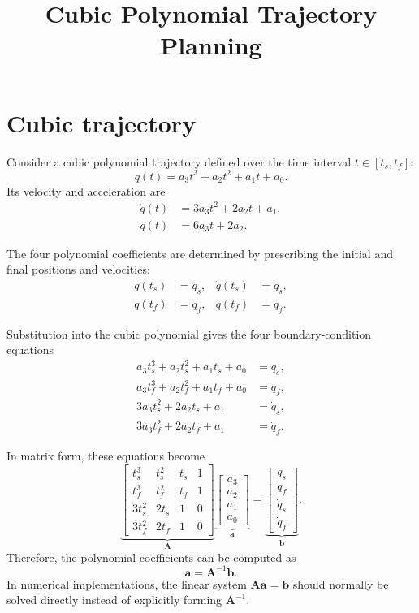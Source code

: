 \documentclass[11pt,a4paper]{article}
\title{Cubic Polynomial Trajectory Planning}
\author{}
\date{}
\begin{document}
\maketitle

\section{Cubic trajectory}

Consider a cubic polynomial trajectory defined over the time interval
$t\in[t_s,t_f]$:
\begin{equation}
    q(t)=a_3t^3+a_2t^2+a_1t+a_0.
\end{equation}
Its velocity and acceleration are
\begin{align}
    \dot q(t) &= 3a_3t^2+2a_2t+a_1,\\
    \ddot q(t) &= 6a_3t+2a_2.
\end{align}

The four polynomial coefficients are determined by prescribing the initial
and final positions and velocities:
\begin{align}
    q(t_s) &= q_s, & \dot q(t_s) &= \dot q_s,\\
    q(t_f) &= q_f, & \dot q(t_f) &= \dot q_f.
\end{align}

Substitution into the cubic polynomial gives the four boundary-condition
equations
\begin{align}
    a_3t_s^3+a_2t_s^2+a_1t_s+a_0 &= q_s,\\
    a_3t_f^3+a_2t_f^2+a_1t_f+a_0 &= q_f,\\
    3a_3t_s^2+2a_2t_s+a_1 &= \dot q_s,\\
    3a_3t_f^2+2a_2t_f+a_1 &= \dot q_f.
\end{align}

In matrix form, these equations become
\begin{equation}
\underbrace{\begin{bmatrix}
    t_s^3  & t_s^2 & t_s & 1\\
    t_f^3  & t_f^2 & t_f & 1\\
    3t_s^2 & 2t_s  & 1   & 0\\
    3t_f^2 & 2t_f  & 1   & 0
\end{bmatrix}}_{\bm{A}}
\underbrace{\begin{bmatrix}
    a_3\\a_2\\a_1\\a_0
\end{bmatrix}}_{\bm{a}}
=
\underbrace{\begin{bmatrix}
    q_s\\q_f\\\dot q_s\\\dot q_f
\end{bmatrix}}_{\bm{b}}.
\end{equation}
Therefore, the polynomial coefficients can be computed as
\begin{equation}
    \boxed{\bm{a}=\bm{A}^{-1}\bm{b}}.
\end{equation}
In numerical implementations, the linear system $\bm{A}\bm{a}=\bm{b}$
should normally be solved directly instead of explicitly forming
$\bm{A}^{-1}$.
\end{document}
